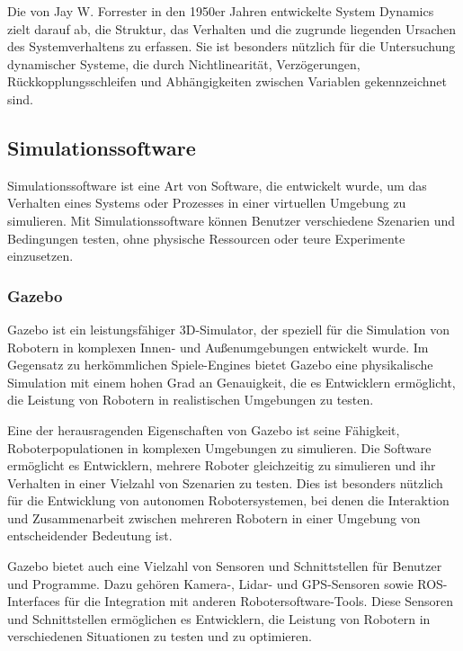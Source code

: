 \begin{description}
    Die von Jay W. Forrester in den 1950er Jahren entwickelte System Dynamics zielt darauf ab, die Struktur, das Verhalten und die zugrunde liegenden Ursachen des Systemverhaltens zu erfassen. Sie ist besonders nützlich für die Untersuchung dynamischer Systeme, die durch Nichtlinearität, Verzögerungen, Rückkopplungsschleifen und Abhängigkeiten zwischen Variablen gekennzeichnet sind.
    \cite[vgl.][]{system-dynamics}

\end{description}

\subsection{Simulationssoftware}
Simulationssoftware ist eine Art von Software, die entwickelt wurde, um das Verhalten eines Systems oder Prozesses in einer virtuellen Umgebung zu simulieren. Mit Simulationssoftware können Benutzer verschiedene Szenarien und Bedingungen testen, ohne physische Ressourcen oder teure Experimente einzusetzen.

\subsubsection{Gazebo} \label{gazebo:subsubsection}
Gazebo ist ein leistungsfähiger 3D-Simulator, der speziell für die Simulation von Robotern in komplexen Innen- und Außenumgebungen entwickelt wurde. Im Gegensatz zu herkömmlichen Spiele-Engines bietet Gazebo eine physikalische Simulation mit einem hohen Grad an Genauigkeit, die es Entwicklern ermöglicht, die Leistung von Robotern in realistischen Umgebungen zu testen.

Eine der herausragenden Eigenschaften von Gazebo ist seine Fähigkeit, Roboterpopulationen in komplexen Umgebungen zu simulieren. Die Software ermöglicht es Entwicklern, mehrere Roboter gleichzeitig zu simulieren und ihr Verhalten in einer Vielzahl von Szenarien zu testen. Dies ist besonders nützlich für die Entwicklung von autonomen Robotersystemen, bei denen die Interaktion und Zusammenarbeit zwischen mehreren Robotern in einer Umgebung von entscheidender Bedeutung ist.

Gazebo bietet auch eine Vielzahl von Sensoren und Schnittstellen für Benutzer und Programme. Dazu gehören Kamera-, Lidar- und GPS-Sensoren sowie ROS-Interfaces für die Integration mit anderen Robotersoftware-Tools. Diese Sensoren und Schnittstellen ermöglichen es Entwicklern, die Leistung von Robotern in verschiedenen Situationen zu testen und zu optimieren.
\cite[vgl.][]{gazebosim}

